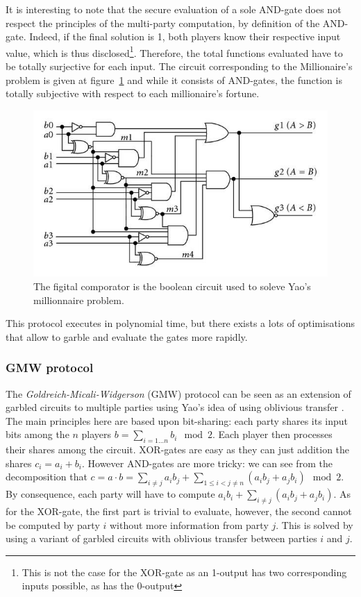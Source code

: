 It is interesting to note that the secure evaluation of a sole AND-gate does not respect the principles of the multi-party computation, by definition of the AND-gate. Indeed, if the final solution is 1, both players know their respective input value, which is thus disclosed\footnote{This is not the case for the XOR-gate as an 1-output has two corresponding inputs possible, as has the 0-output}. Therefore, the total functions evaluated have to be totally surjective for each input. The circuit corresponding to the Millionaire's problem is given at figure~\ref{privacy:yao-comp} and while it consists of AND-gates, the function is totally subjective with respect to each millionaire's fortune.

\begin{figure}[ht!]
    \centering
    \includegraphics[width=.7\textwidth]{parts/chap-3/img-3/yao-comp.jpg}
    \caption{The figital comporator is the boolean circuit used to soleve Yao's millionnaire problem.} 
    \label{privacy:yao-comp}
\end{figure}

This protocol executes in polynomial time, but there exists a lots of optimisations that allow to garble and evaluate the gates more rapidly.

\subsubsection{GMW protocol}
The \emph{Goldreich-Micali-Widgerson} (GMW) protocol can be seen as an extension of garbled circuits to multiple parties using Yao's idea of using oblivious transfer \cite{Goldreich1987HowGame}. The main principles here are based upon bit-sharing: each party shares its input bits among the $n$ players $b = \sum_{i=1\ldots n}b_i \mod 2$. Each player then processes their shares among the circuit. XOR-gates are easy as they can just addition the shares $c_i = a_i + b_i$. However AND-gates are more tricky: we can see from the decomposition that $c = a \cdot b = \sum_{i\neq j}a_ib_j+\sum_{1\leq i< j\neq n}\left(a_ib_j + a_jb_i \right) \mod 2$. By consequence, each party will have to compute $a_ib_i+ \sum_{i\neq j}\left( a_ib_j + a_jb_i\right)$. As for the XOR-gate, the first part is trivial to evaluate, however, the second cannot be computed by party $i$ without more information from party $j$. This is solved by using a variant of garbled circuits with oblivious transfer between parties $i$ and $j$.

